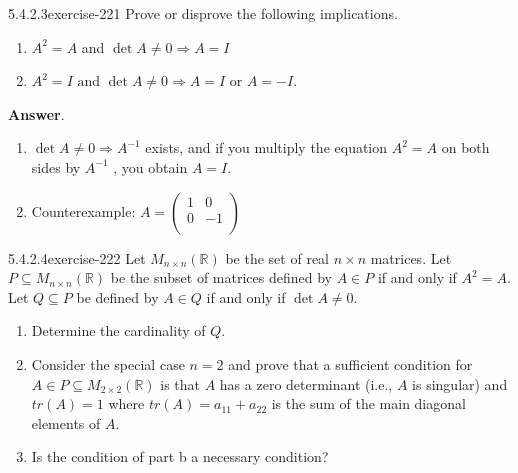 \documentclass[twoside,10pt,]{book}
\numberwithin{equation}{section}
\begin{document}
\begin{divisionsolution}{5.4.2.3}{}{exercise-221}%
\hypertarget{p-1906}{}%
Prove or disprove the following implications.%
\par
\hypertarget{p-1907}{}%
\leavevmode%
\begin{enumerate}[label=(\alph*)]
\item\hypertarget{li-1016}{}\hypertarget{p-1908}{}%
\(A^2= A\) and \(\det  A \neq  0 \Rightarrow  A =I\)%
\item\hypertarget{li-1017}{}\hypertarget{p-1909}{}%
\(A^2 = I \textrm{ and } \det A \neq  0 \Rightarrow  A = I \textrm{ or } A = -I\).%
\end{enumerate}
%
\par\smallskip%
\noindent\textbf{Answer}.\quad%
\hypertarget{p-1910}{}%
\leavevmode%
\begin{enumerate}[label=(\alph*)]
\item\hypertarget{li-1018}{}\hypertarget{p-1911}{}%
\(\det  A \neq 0\Rightarrow A^{-1}\) exists, and if you multiply the equation \(A^2=A\) on both sides by \(A^{-1}\) , you obtain \(A=I\).%
\item\hypertarget{li-1019}{}Counterexample: \(A=\left(
\begin{array}{cc}
1 & 0 \\
0 & -1 \\
\end{array}
\right)\)%
\end{enumerate}
%
\end{divisionsolution}%
\begin{divisionsolution}{5.4.2.4}{}{exercise-222}%
\hypertarget{p-1912}{}%
Let \(M_{n\times n}(\mathbb{R})\) be the set of real \(n\times n\) matrices. Let \(P \subseteq  M_{n\times n}(\mathbb{R})\) be the subset of matrices defined by \(A \in  P\) if and only if \(A^2 = A\). Let \(Q \subseteq  P\) be defined by \(A\in Q\) if and only if \(\det A \neq  0\).%
\par
\hypertarget{p-1913}{}%
\leavevmode%
\begin{enumerate}[label=(\alph*)]
\item\hypertarget{li-1020}{}\hypertarget{p-1914}{}%
Determine the cardinality of \(Q\).%
\item\hypertarget{li-1021}{}\hypertarget{p-1915}{}%
Consider the special case \(n = 2\) and prove that a sufficient condition for \(A \in  P \subseteq  M_{2\times 2}(\mathbb{R})\) is that \(A\) has a zero determinant (i.e., \(A\) is singular) and \(tr(A) = 1\) where \(tr(A) = a_{11}+ a _{22}\) is the sum of the main diagonal elements of \(A\).%
\item\hypertarget{li-1022}{}\hypertarget{p-1916}{}%
Is the condition of part b a necessary condition?%
\end{enumerate}
%
\end{divisionsolution}%
\end{document}
